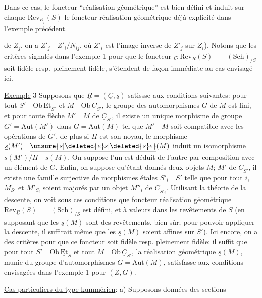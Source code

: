 Dans ce cas, le foncteur ``réalisation géométrique'' est bien défini et induit sur chaque $\mathrm{Rev}_{\underline{R}_i}(S)$ le foncteur réalisation géométrique déjà explicité dans \hspace{3em} l'exemple précédent.

de $Z_j$, on a $Z'_j\quad Z'_i/N_{ij}$, où $Z'_i$ est l'image inverse de $Z'_j$ sur $Z_i$). Notons que les critères signalés dans l'exemple 1 pour que le foncteur $\underline{r}:\mathrm{Rev}_{\underline{R}}(S)\qquad(\mathrm{Sch})_{/S}$ soit fidèle resp. pleinement fidèle, s'étendent de façon immédiate au cas envisagé ici.

\uline{Exemple} 3 Supposons que $\underline{R}=(\underline{C},\underline{s})$ satissse aux conditions suivantes: pour tout $S'\quad\mathrm{Ob}\,\underline{\mathrm{Et}}_S$, et $M\quad\mathrm{Ob}\,\underline{C}_{S'}$, le groupe des automorphismes $G$ de $M$ est fini, et pour toute flèche $M'\quad M$ de $\underline{C}_{S'}$, il existe un unique morphisme de groupe $G'=\mathrm{Aut}(M')$ dans $G=\mathrm{Aut}(M)$ tel que $M'\quad M$ soit compatible avec les opérations de $G'$, de plus si $H$ est son noyau, le morphisme $\underline{s}(M')\quad\underline{\unsure{s|\deleted{e}s|\deleted{s}e}}(M)$ induit un isomorphisme $\underline{s}(M')/H\quad\underline{s}(M)$.  On suppose  l'un est déduit de l'autre par composition avec un élément de $G$. Enfin, on suppose qu'étant donnés deux objets $M$; $M'$ de $\underline{C}_{S'}$, il existe une famille surjective de morphismes étales $S'_i\quad S'$ telle que pour tout $i$, $M_{S'}$ et $M'_{S_i}$ soient majorés par un objet $M''_i$ de $\underline{C}_{S'_i}$. Utilisant la théorie de la descente, on voit sous ces conditions que  foncteur réalisation géométrique  $\mathrm{Rev}_{\underline{R}}(S)\qquad(\mathrm{Sch})_{/S}$ est défini, et à valeurs dans les  revêtements de $S$ (en supposant que les $\underline{s}(M)$ sont des revêtements, bien sûr; pour pouvoir appliquer la descente, il suffirait même que les $\underline{s}(M)$ soient affines sur $S'$). Ici encore, on a des critères pour que ce foncteur soit fidèle resp. pleinement fidèle: il suffit que pour tout $S'\quad\mathrm{Ob}\,\underline{\mathrm{Et}}_S$ et tout $M\quad\mathrm{Ob}\,\underline{C}_{S'}$, la réalisation géométrique $\underline{s}(M)$, munie du groupe d'automorphismes $G=\mathrm{Aut}(M)$, satisfasse aux conditions  envisagées dans l'exemple 1 pour $(Z,G)$.

\uline{Cas particuliers du type kummérien}: a) Supposons données des sections
